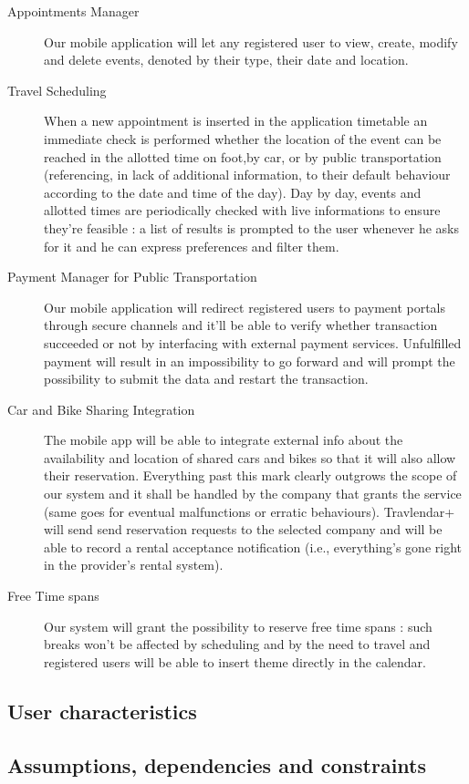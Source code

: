 		\begin{description}

		\item[Appointments Manager]
		
Our mobile application will let any registered user to view, create, modify and delete events, denoted by their type, their date and location. \\

		\item[Travel Scheduling]

When a new appointment is inserted in the application timetable an immediate check is performed whether the location of the event can be reached in the allotted time on foot,by car, or by public transportation (referencing, in lack of additional information, to their default behaviour according to the date and time of the day).
Day by day, events and allotted times are periodically checked with live informations to ensure they’re feasible : a list of results is prompted to the user whenever he asks for it and he can express preferences and filter them.\\

		\item[Payment Manager for Public Transportation]

Our mobile application will redirect registered users to payment portals through secure channels and it’ll be able to verify whether transaction succeeded or not by interfacing with external payment services.
Unfulfilled payment will result in an impossibility to go forward and will prompt the possibility to submit the data and restart the transaction.\\

		\item[Car and Bike Sharing Integration]

The mobile app will be able to integrate external info about the availability and location of shared cars and bikes so that it will also allow their reservation.
Everything past this mark clearly outgrows the scope of our system and it shall be handled by the company that grants the service (same goes for eventual malfunctions or erratic behaviours). 
Travlendar+ will send send reservation requests to the selected company and will be able to record a rental acceptance notification (i.e., everything’s gone right in the provider’s rental system).\\


		\item[Free Time spans]

Our system will grant the possibility to reserve free time spans : such breaks won’t be affected by scheduling and by the need to travel and registered users will be able to insert theme directly in the calendar.\\

		\end{description}

			
		\subsection{User characteristics}
			
		\subsection{Assumptions, dependencies and constraints}
